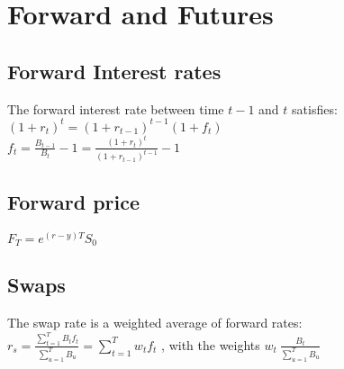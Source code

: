\section{Forward and Futures}


\subsection*{Forward Interest rates}
The forward interest rate between time $t-1$ and $t$ satisfies:\\
$ (1+r_t)^t = (1+r_{t-1})^{t-1}(1+f_t) $ \\
$ f_t = \frac{B_{t-1}}{B_t} -1 =\frac{(1+r_t)^t}{(1+r_{t-1})^{t-1}} -1 $


\subsection*{Forward price}
$F_T=e^{(r-y)T} S_0$


\subsection*{Swaps}
The swap rate is a weighted average of forward rates: \\
$r_s = \frac{\sum_{t=1}^{T}B_t f_t}{\sum_{u=1}^{T}B_u} = \sum_{t=1}^{T} w_t  f_t$ , 
with the weights $w_t \ \frac{B_t}{\sum_{u=1}^{T} B_u}$ \\